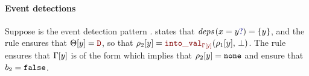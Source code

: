 \begin{skippableproof}
    \paragraph{Event detections}
    Suppose  is the event detection pattern
    .
     states that
    $\deps{\detect{x}{y}} = \{y\}$, and the rule  ensures that $\Theta[y] = \dType$, so that $\rho_2[y] = \intoVal
        {\tyCtx[y]}{\rho_1[y]}{\bot}$.
    The rule  ensures that $\Gamma[y]$ is of the
    form  which implies that $\rho_2[y] = \mathtt{{none}}$ and
     ensure that $b_2 = \mathtt{{false}}$.


\end{skippableproof}
